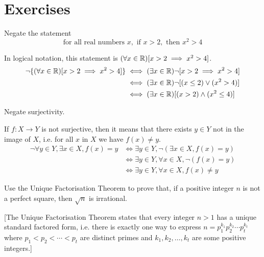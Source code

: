 \section*{Exercises}

\begin{exercise}
Negate the statement
\[ \text{for all real numbers } x, \text{ if } x>2, \text{ then } x^2>4 \]
\end{exercise}

\begin{solution}
In logical notation, this statement is $(\forall x \in \mathbb R)[x>2 \implies x^2>4]$.
\begin{align*}
\lnot\{(\forall x \in \mathbb R)[x>2 \implies x^2>4]\} 
&\iff (\exists x \in \mathbb R) \lnot[x>2 \implies x^2>4] \\
&\iff (\exists x \in \mathbb R) \lnot [(x\le2) \lor (x^2>4)] \\
&\iff (\exists x \in \mathbb R) [(x>2) \land (x^2\le4)]
\end{align*}
\end{solution}

\begin{exercise}
Negate surjectivity.
\end{exercise}

\begin{solution}
If $f:X\to Y$ is not surjective, then it means that there exists $y \in Y$ not in the image of $X$, i.e. for all $x$ in $X$ we have $f(x)\neq y$.
\begin{align*}
\lnot \forall y \in Y, \exists x \in X, f(x)=y 
&\iff \exists y \in Y, \lnot (\exists x \in X, f(x)=y) \\
&\iff \exists y \in Y, \forall x \in X, \lnot (f(x)=y) \\
&\iff \exists y \in Y, \forall x \in X, f(x) \neq y
\end{align*}
\end{solution}

\begin{exercise}
Use the Unique Factorisation Theorem to prove that, if a positive integer $n$ is not a perfect square, then $\sqrt{n}$ is irrational.

[The Unique Factorisation Theorem states that every integer $n>1$ has a unique standard factored form, i.e. there is exactly one way to express $n=p_1^{k_1}p_2^{k_2}\cdots p_t^{k_t}$ where $p_1<p_2<\cdots<p_t$ are distinct primes and $k_1,k_2,\dots,k_t$ are some positive integers.]
\end{exercise}


